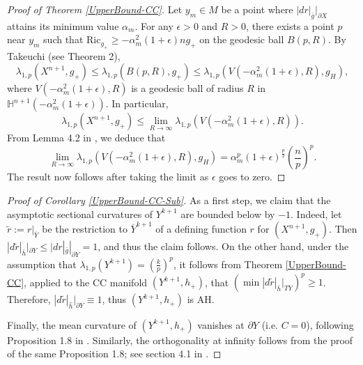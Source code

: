 \documentclass{amsart}
\newcommand{\Ric}{\text{Ric}}
\begin{document}
\begin{proof}[Proof of Theorem \ref{UpperBound-CC}]
    Let $y_m\in M$ be a point where $|dr|_{\bar g}|_{\partial X}$ attains its minimum value $\alpha_m$. For any $\epsilon>0$ and  $R>0$, there exists a point $p$ near $y_m$ such that $\Ric_{g_+}\ge -\alpha_m^2(1+\epsilon)ng_+$ on the geodesic ball $B(p,R)$. By Takeuchi \cite{Takeuchi} (see Theorem 2), 
    \begin{equation}
        \lambda_{1,p}(X^{n+1},g_+)\le \lambda_{1,p}(B(p,R),g_+) \le \lambda_{1,p}(V(-\alpha_m^2(1+\epsilon),R),g_H),
    \end{equation}
    where $V(-\alpha_m^2(1+\epsilon),R)$ is a geodesic ball of radius $R$ in $\mathbb{H}^{n+1}(-\alpha_m^2(1+\epsilon))$. In particular, 
    \begin{equation}
        \lambda_{1,p}(X^{n+1},g_+)\le \lim_{R\to\infty} \lambda_{1,p}(V(-\alpha_m^2(1+\epsilon),R)).
    \end{equation}
    From Lemma 4.2 in \cite{jin2024lowerbounddirichleteigenvalue}, we deduce that
    \begin{equation}
        \lim_{R\to\infty} \lambda_{1,p}(V(-\alpha_m^2(1+\epsilon),R),g_H) = \alpha_m^p(1+\epsilon)^{\frac{p}{2}}\left(\frac{n}{p}\right)^p.
    \end{equation}
    The result now follows after taking the limit as $\epsilon$ goes to zero. 
\end{proof}

\begin{proof}[Proof of Corollary \ref{UpperBound-CC-Sub}]
    As a first step, we claim that the asymptotic sectional curvatures of $Y^{k+1}$ are bounded below by $-1$. Indeed, let $\tilde r:= r|_{\overline Y}$ be the restriction to $\overline Y^{k+1}$ of a defining function $r$ for $(X^{n+1},g_+)$. Then $|d\tilde r|_{\bar h}|_{\partial Y}\le |dr|_{\bar g}|_{\partial Y} = 1$, and thus the claim follows. On the other hand, under the assumption that $\lambda_{1,p}(Y^{k+1}) = \left(\frac{k}{p}\right)^p$, it follows from Theorem \ref{UpperBound-CC}, applied to the CC manifold $(Y^{k+1},h_+)$, that $(\min |d\tilde r|_{\bar h}|_{TY})^p\ge 1$. Therefore, $|d\tilde r|_{\hat h}|_{\partial Y}\equiv 1$, thus $(Y^{k+1},h_+)$ is AH.

    Finally, the mean curvature of $(Y^{k+1},h_+)$ vanishes at $\partial Y$ (i.e. $C=0$), following Proposition 1.8 in \cite{PerezAyalaTyrrell}. Similarly, the orthogonality at infinity follows from the proof of the same Proposition 1.8; see section 4.1 in \cite{Perez-AyalaSamuel2025HaCc}.
\end{proof}
\end{document}
